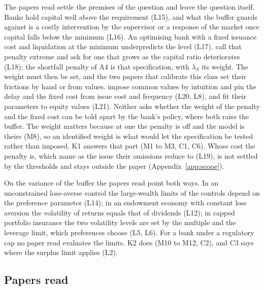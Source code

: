 The papers read settle the premises of the question and leave the question
itself. Banks hold capital well above the requirement (L15), and what the
buffer guards against is a costly intervention by the supervisor or a response
of the market once capital falls below the minimum (L16). An optimising bank
with a fixed issuance cost and liquidation at the minimum underpredicts the
level (L17). \citet{peura2006} call that penalty extreme and ask for one that
grows as the capital ratio deteriorates (L18); the shortfall penalty of A4 is
that specification, with $\lambda_S$ its weight. The weight must then be set,
and the two papers that calibrate this class set their frictions by hand or
from values. \citet{peura2006} impose common values by intuition and pin the
delay and the fixed cost from issue cost and frequency (L20, L8), and
\citet{daihuangkeppo2019} fit their parameters to equity values (L21). Neither
asks whether the weight of the penalty and the fixed cost can be told apart by
the bank's policy, where both raise the buffer. The weight matters because at
one the penalty is off and the model is theirs (M8), so an identified weight is
what would let the specification be tested rather than imposed. K1 answers
that part (M1 to M3, C1, C6). Whose cost the penalty is, which \citet{peura2006} name as the
issue their omissions reduce to (L19), is not settled by the thresholds and
stays outside the paper (Appendix~\ref{app:scope}).

On the variance of the buffer the papers read point both ways. In an
unconstrained loss-averse control the large-wealth limits of the controls
depend on the preference parameter (L14); in an endowment economy with
constant loss aversion the volatility of returns equals that of dividends
(L12); in capped portfolio insurance the two volatility levels are set by the
multiple and the leverage limit, which preferences choose (L5, L6). For a bank
under a regulatory cap no paper read evaluates the limits. K2 does (M10 to
M12, C2), and C3 says where the surplus limit applies (L2).

\subsection{Papers read}

